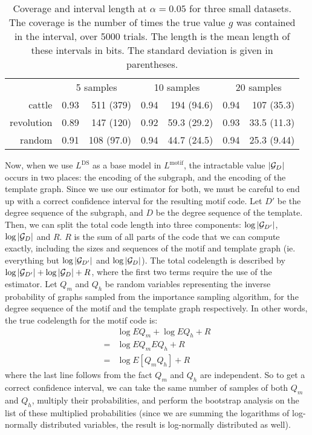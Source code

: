 \begin{table}
  {\centering
  \begin{tabular}{|r|r r|r r|r r|}
  \hline
   &  \multicolumn{2}{c|}{5 samples} & \multicolumn{2}{c|}{10 samples}  & \multicolumn{2}{c|}{20 samples}  \\
  cattle  & 0.93 & 511 (379) & 0.94 & 194 (94.6) & 0.94 & 107 (35.3) \\
  revolution   & 0.89 & 147 (120) & 0.92 & 59.3 (29.2) & 0.93 & 33.5 (11.3) \\
  random  & 0.91 & 108 (97.0) & 0.94 & 44.7 (24.5) & 0.94 & 25.3 (9.44) \\
  \hline
  \end{tabular}
  }

  \caption{Coverage and interval length at $\alpha=0.05$ for three small datasets. The coverage is the number of times the true value $g$ was contained in the interval, over 5000 trials. The length is the mean length of these intervals in bits. The standard deviation is given in parentheses. } 
  \label{table:coverage-experiment}
\end{table}

Now, when we use $L^\text{DS}$ as a base model in $L^\text{motif}$, the intractable value $|{\mathcal G}_D|$ occurs in two places: the encoding of the subgraph, and the encoding of the template graph. Since we use our estimator for both, we must be careful to end up with a correct confidence interval for the resulting motif code. Let $D'$ be the degree sequence of the subgraph, and $D$ be the degree sequence of the template. Then, we can split the total code length into three components: $\log |{\mathcal G}_{D'}|$, $\log |{\mathcal G}_D|$ and $R$. $R$ is the sum of all parts of the code that we can compute exactly, including the sizes and sequences of the motif and template graph (ie. everything but $\log |{\mathcal G}_{D'}|$ and $\log |{\mathcal G}_D|$). The total codelength is described by $\log |{\mathcal G}_{D'}| + \log |{\mathcal G}_D| + R$, where the first two terms require the use of the estimator. Let $Q_m$ and $Q_h$ be random variables representing the inverse probability of graphs sampled from the importance sampling algorithm, for the degree sequence of the motif and the template graph respectively. In other words, the true codelength for the motif code is:
\begin{align*}
& \log E Q_m + \log  E Q_h + R \\ 
= & \log E Q_m E Q_h + R \\
= & \log E [Q_m Q_h] + R
\end{align*}
where the last line follows from the fact $Q_m$ and $Q_h$ are independent. So to get a correct confidence interval, we can take the same number of samples of both $Q_m$ and $Q_h$, multiply their probabilities, and perform the bootstrap analysis on the list of these multiplied probabilities (since we are summing the logarithms of log-normally distributed variables, the result is log-normally distributed as well). 

